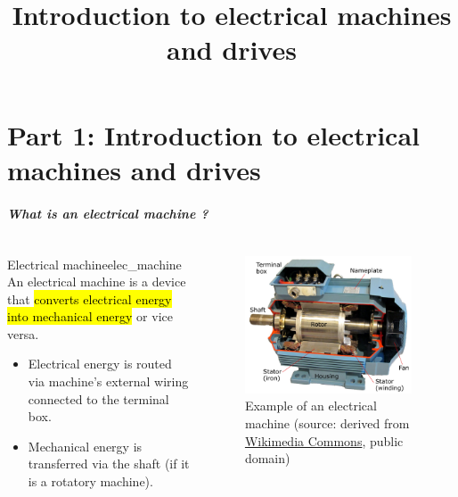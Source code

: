 \part{Part 1: Introduction to electrical machines and drives}
\title[Introduction]{Introduction to electrical machines and drives}  
\date{}  
\frame{\titlepage} 

\begin{frame}
	\frametitle{What is an electrical machine ?}
	\begin{columns}
		\begin{column}{0.5\textwidth}
			\begin{defi}{Electrical machine}{elec_machine}
			   An electrical machine is a device that \hl{converts electrical energy into  mechanical energy} or vice versa.
			\end{defi}
			\vspace{0.25cm}
			\begin{itemize}
				\item Electrical energy is routed via machine's external wiring connected to the terminal box.
				\item Mechanical energy is transferred via the shaft (if it is a rotatory machine).
			\end{itemize}
		\end{column}
		\begin{column}{0.5\textwidth}
			\begin{figure}
				\centering
				\includegraphics[width=0.95\textwidth]{fig/lec01/Induction_machine_opened.pdf}
				\caption{Example of an electrical machine (source: derived from \href{https://commons.wikimedia.org/wiki/File:TMW_50906_Schnittmodell_einer_Drehstrommaschine_(Asynchronmaschine).jpg}{Wikimedia Commons}, public domain)}
			\end{figure}
		\end{column}
		\end{columns}
\end{frame}


